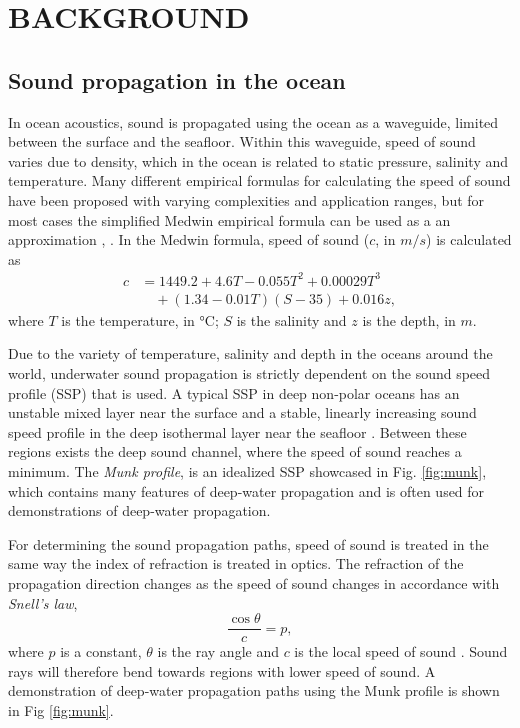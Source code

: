 \documentclass[fleqn]{jaes}
\begin{document}
\section{BACKGROUND}

\subsection{Sound propagation in the ocean}
In ocean acoustics, sound is propagated using the ocean as a waveguide, limited between the surface and the seafloor. Within this waveguide, speed of sound varies due to density, which in the ocean is related to static pressure, salinity and temperature. Many different empirical formulas for calculating the speed of sound have been proposed \cite{Huang} with varying complexities and application ranges, but for most cases the simplified Medwin empirical formula can be used as a an approximation \cite{Jensen}, \cite{Lurton}. In the Medwin formula, speed of sound ($c$, in $m/s$) is calculated as
\begin{equation}
\begin{split}
c &= 1449.2 + 4.6T - 0.055T^2 + 0.00029T^3 \\
  &\quad + (1.34 - 0.01T)(S-35) + 0.016z,
\end{split}
\label{eq:speedofsound}
\end{equation}
where $T$ is the temperature, in °C; $S$ is the salinity and $z$ is the depth, in $m$.

Due to the variety of temperature, salinity and depth in the oceans around the world, underwater sound propagation is strictly dependent on the sound speed profile (SSP) that is used. A typical SSP in deep non-polar oceans has an unstable mixed layer near the surface and a stable, linearly increasing sound speed profile in the deep isothermal layer near the seafloor \cite{Jensen}. Between these regions exists the deep sound channel, where the speed of sound reaches a minimum. The \textit{Munk profile}, is an idealized SSP showcased in Fig. \ref{fig:munk}, which contains many features of deep-water propagation and is often used for demonstrations of deep-water propagation.

For determining the sound propagation paths, speed of sound is treated in the same way the index of refraction is treated in optics. The refraction of the propagation direction changes as the speed of sound changes in accordance with \textit{Snell's law},
\begin{equation}
\frac{\cos{\theta}}{c}= p,
\label{eq:snellslaw}
\end{equation}
where $p$ is a constant, $\theta$ is the ray angle and $c$ is the local speed of sound \cite{Lurton}. Sound rays will therefore bend towards regions with lower speed of sound. A demonstration of deep-water propagation paths using the Munk profile is shown in Fig \ref{fig:munk}.
\end{document}
